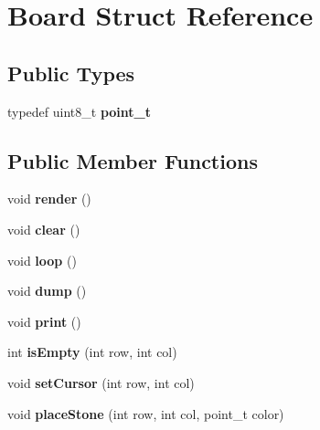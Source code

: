 \hypertarget{struct_board}{}\section{Board Struct Reference}
\label{struct_board}
\subsection*{Public Types}
\begin{DoxyCompactItemize}
\item 
\mbox{\label{struct_board_affa1df63ffb36c8b836a81f7b40fc7f2}} 
typedef uint8\+\_\+t {\bfseries point\+\_\+t}
\end{DoxyCompactItemize}
\subsection*{Public Member Functions}
\begin{DoxyCompactItemize}
\item 
\mbox{\label{struct_board_a6ca77471cf4df32ec4ea1da795065327}} 
void {\bfseries render} ()
\item 
\mbox{\label{struct_board_af74f0d4b43e5aa3faea16d7c6407b05e}} 
void {\bfseries clear} ()
\item 
\mbox{\label{struct_board_aecaa74411a0ca7ba6703bbb716f43d8e}} 
void {\bfseries loop} ()
\item 
\mbox{\label{struct_board_a0fa6a1338026b165e880e7ab322bf8aa}} 
void {\bfseries dump} ()
\item 
\mbox{\label{struct_board_a44c7bca1c10c053898c048dc4c13f0d5}} 
void {\bfseries print} ()
\item 
\mbox{\label{struct_board_a9d097e275bb3adff2197cffd56e91900}} 
int {\bfseries is\+Empty} (int row, int col)
\item 
\mbox{\label{struct_board_ae8b790d2df7f363a7b57dffd2368c2f9}} 
void {\bfseries set\+Cursor} (int row, int col)
\item 
\mbox{\label{struct_board_a9d61ff52990c23d5b688a3e29ae774b5}} 
void {\bfseries place\+Stone} (int row, int col, point\+\_\+t color)
\end{DoxyCompactItemize}
